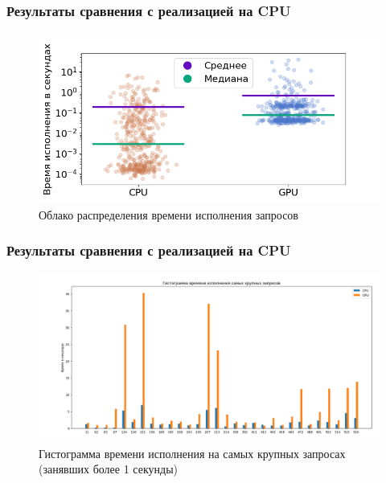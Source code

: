 \documentclass{beamer}
\begin{document}
\begin{frame}[t]
  \frametitle{Результаты сравнения с реализацией на CPU}
  
\begin{figure}[H]
    \centering
    \includegraphics[scale = 0.57]{pictures/Cloud.png}
    \caption{Облако распределения времени исполнения запросов}
    \label{GraphicFull}  
\end{figure}
    
\end{frame}


\begin{frame}[t]
  \frametitle{Результаты сравнения с реализацией на CPU}
  
\begin{figure}[H]
    \centering
    \includegraphics[scale=0.3]{pictures/HistBig.png}
    \caption{Гистограмма времени исполнения на самых крупных запросах (занявших более 1 секунды)}
\end{figure}
   
\end{frame}
\end{document}
